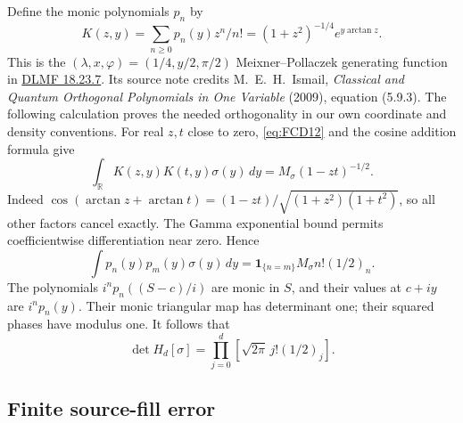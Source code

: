 Define the monic polynomials \(p_n\) by
\[
 K(z,y)=\sum_{n\ge0}p_n(y)z^n/n!
       =(1+z^2)^{-1/4}e^{y\arctan z}.
\]
This is the \((\lambda,x,\varphi)=(1/4,y/2,\pi/2)\)
Meixner--Pollaczek generating function in
\href{https://dlmf.nist.gov/18.23.E7}{DLMF 18.23.7}.
Its source note credits M.~E.~H.~Ismail, \emph{Classical and Quantum
Orthogonal Polynomials in One Variable} (2009), equation (5.9.3).
The following calculation proves the needed orthogonality in our own
coordinate and density conventions.
For real \(z,t\) close to zero, \eqref{eq:FCD12} and the cosine addition
formula give
\[
 \int_{\mathbb R}K(z,y)K(t,y)\sigma(y)\,dy
    =M_\sigma(1-zt)^{-1/2}.
\]
Indeed
\(\cos(\arctan z+\arctan t)
 =(1-zt)/\sqrt{(1+z^2)(1+t^2)}\), so all other factors cancel
exactly. The Gamma exponential bound permits coefficientwise
differentiation near zero. Hence
\begin{equation}
 \int p_n(y)p_m(y)\sigma(y)\,dy
       =\mathbf1_{\{n=m\}}M_\sigma n!(1/2)_n .
 \tag{FCD13}\label{eq:FCD13}
\end{equation}
The polynomials \(i^np_n((S-c)/i)\) are monic in \(S\), and their
values at \(c+iy\) are \(i^np_n(y)\). Their monic triangular map
has determinant one; their squared phases have modulus one.
It follows that
\begin{equation}
 \boxed{\displaystyle
 \det H_d[\sigma]
       =\prod_{j=0}^d\left[\sqrt{2\pi}\,j!(1/2)_j\right].}
 \tag{FCD14}\label{eq:FCD14}
\end{equation}

\subsection{Finite source-fill error}

